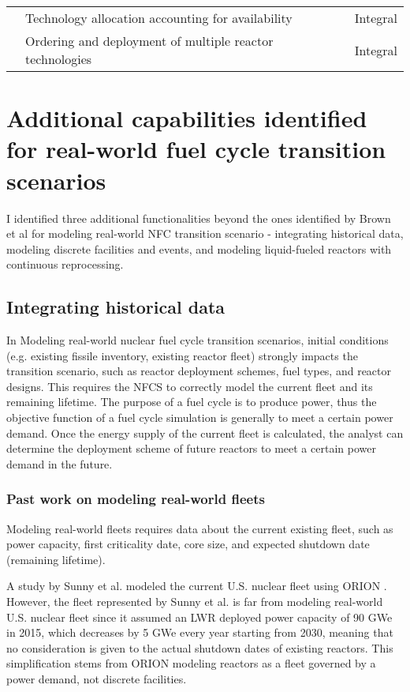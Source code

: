 \begin{table}[h]
\begin{tabularx}{\textwidth}{lXl}
        \hline

         & Technology allocation accounting for availability &Integral \\
        	& Ordering and deployment of multiple reactor technologies &Integral \\
        \hline
    \end{tabularx}
\end{table}

\section{Additional capabilities identified for real-world fuel cycle transition scenarios}
I identified three additional functionalities beyond the ones identified by Brown et al \cite{brown_identification_2016}
for modeling real-world \gls{NFC} transition scenario -
integrating historical data, modeling discrete facilities and events, and modeling liquid-fueled
reactors with continuous reprocessing.

\subsection{Integrating historical data}
In Modeling real-world nuclear fuel cycle transition scenarios, initial
conditions (e.g. existing fissile inventory, existing reactor fleet) 
strongly impacts
the transition scenario, such as reactor deployment
schemes, fuel types, and reactor designs. 
This requires the \gls{NFCS} to correctly model the current fleet and its
remaining lifetime. The purpose of a fuel cycle is to produce power, thus the objective
function of a fuel cycle simulation is generally to meet a certain power demand.
Once the energy supply of the current fleet is calculated,
the analyst can determine the deployment scheme of future reactors to meet a certain
power demand in the future. 

\subsubsection{Past work on modeling real-world fleets}
Modeling real-world fleets requires data about the current existing fleet,
such as power capacity, first criticality date, core size, and expected shutdown date (remaining lifetime).

A study by Sunny et al. modeled the current U.S. nuclear fleet
using ORION \cite{sunny_transition_2015}. However, the fleet represented
by Sunny et al. is far from
modeling real-world U.S. nuclear fleet since it assumed an \gls{LWR} deployed power capacity
of 90 GWe in 2015, which decreases by 5 GWe every year starting from 2030,
meaning that no consideration is given to the actual shutdown dates of
existing reactors. This simplification stems from ORION modeling reactors as
a fleet governed by a power demand, not discrete facilities.

